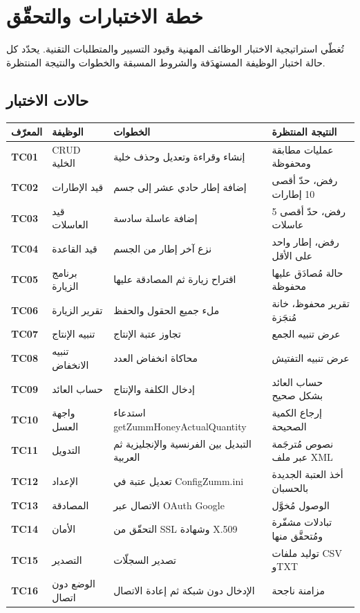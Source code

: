 \chapter{خطة الاختبارات والتحقّق}
\label{chap:tests}
تُغطّي استراتيجية الاختبار الوظائف المهنية وقيود التسيير والمتطلبات التقنية.
يحدّد كل حالة اختبار الوظيفة المستهدَفة والشروط المسبقة والخطوات والنتيجة المنتظرة.

\section{حالات الاختبار}
\begin{xltabular}{\textwidth}{>{\bfseries}p{1.6cm} p{3.4cm} p{4.2cm} X}
\toprule
\textbf{المعرّف} & \textbf{الوظيفة} & \textbf{الخطوات} & \textbf{النتيجة المنتظرة} \\
\midrule
\endhead
TC01 & CRUD الخلية & إنشاء وقراءة وتعديل وحذف خلية & عمليات مطابقة ومحفوظة \\
TC02 & قيد الإطارات & إضافة إطار حادي عشر إلى جسم & رفض، حدّ أقصى 10 إطارات \\
TC03 & قيد العاسلات & إضافة عاسلة سادسة & رفض، حدّ أقصى 5 عاسلات \\
TC04 & قيد القاعدة & نزع آخر إطار من الجسم & رفض، إطار واحد على الأقل \\
TC05 & برنامج الزيارة & اقتراح زيارة ثم المصادقة عليها & حالة مُصادَق عليها محفوظة \\
TC06 & تقرير الزيارة & ملء جميع الحقول والحفظ & تقرير محفوظ، خانة مُنجَزة \\
TC07 & تنبيه الإنتاج & تجاوز عتبة الإنتاج & عرض تنبيه الجمع \\
TC08 & تنبيه الانخفاض & محاكاة انخفاض العدد & عرض تنبيه التفتيش \\
TC09 & حساب العائد & إدخال الكلفة والإنتاج & حساب العائد بشكل صحيح \\
TC10 & واجهة العسل & استدعاء getZummHoneyActualQuantity & إرجاع الكمية الصحيحة \\
TC11 & التدويل & التبديل بين الفرنسية والإنجليزية ثم العربية & نصوص مُترجَمة عبر ملف XML \\
TC12 & الإعداد & تعديل عتبة في ConfigZumm.ini & أخذ العتبة الجديدة بالحسبان \\
TC13 & المصادقة & الاتصال عبر OAuth Google & الوصول مُخوَّل \\
TC14 & الأمان & التحقّق من SSL وشهادة X.509 & تبادلات مشفّرة ومُتحقَّق منها \\
TC15 & التصدير & تصدير السجلّات & توليد ملفات CSV وTXT \\
TC16 & الوضع دون اتصال & الإدخال دون شبكة ثم إعادة الاتصال & مزامنة ناجحة \\
\bottomrule
\end{xltabular}

